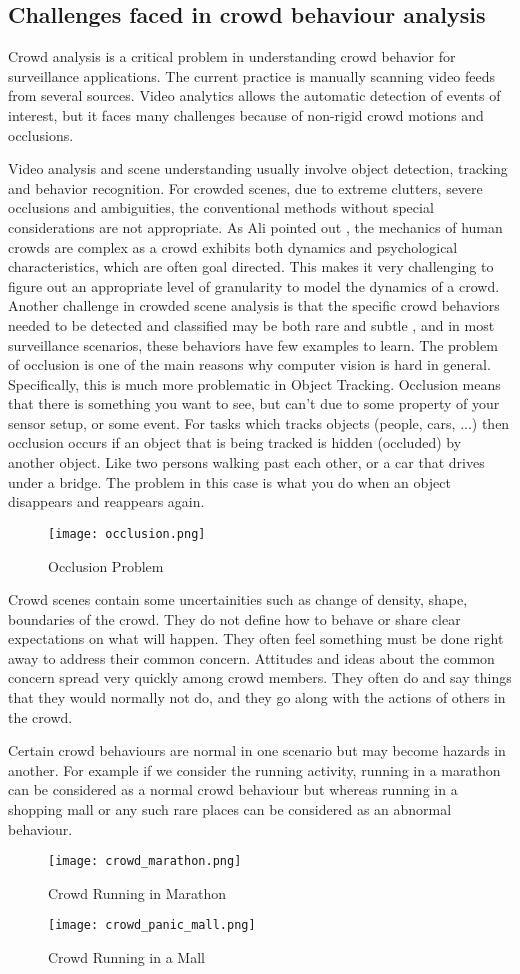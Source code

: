 \subsection{Challenges faced in crowd behaviour analysis}
Crowd analysis is a critical problem in understanding crowd behavior for
surveillance applications. The current practice is manually scanning video feeds from
several sources. Video analytics allows the automatic detection of events of interest, but
it faces many challenges because of non-rigid crowd motions and occlusions.\par
Video analysis and scene understanding usually involve object detection,
tracking and behavior recognition. For crowded scenes, due to extreme clutters, severe
occlusions and ambiguities, the conventional methods without special considerations are
not appropriate. As Ali pointed out , the mechanics of human crowds are complex as a
crowd exhibits both dynamics and psychological characteristics, which are often goal
directed. This makes it very challenging to figure out an appropriate level of granularity
to model the dynamics of a crowd. Another challenge in crowded scene analysis is that
the specific crowd behaviors needed to be detected and classified may be both rare and
subtle , and in most surveillance scenarios, these behaviors have few examples to learn.
The problem of occlusion is one of the main reasons why computer vision is
hard in general. Specifically, this is much more problematic in Object Tracking.
Occlusion means that there is something you want to see, but can't due to some property
of your sensor setup, or some event. For tasks which tracks objects (people, cars, ...)
then occlusion occurs if an object that is being tracked is hidden (occluded) by another
object. Like two persons walking past each other, or a car that drives under a bridge.
The problem in this case is what you do when an object disappears and reappears again.
\begin{figure}[H]
\centering
\texttt{[image: occlusion.png]}
\caption{Occlusion Problem}
\end{figure}
Crowd scenes contain some uncertainities such as change of density, shape,
boundaries of the crowd. They do not define how to behave or share clear expectations
on what will happen. They often feel something must be done right away to address
their common concern. Attitudes and ideas about the common concern spread very
quickly among crowd members. They often do and say things that they would normally
not do, and they go along with the actions of others in the crowd.\par
Certain crowd behaviours are normal in one scenario but may become hazards in
another. For example if we consider the running activity, running in a marathon can be
considered as a normal crowd behaviour but whereas running in a shopping mall or any
such rare places can be considered as an abnormal behaviour.
\begin{figure}[H]
\centering
\texttt{[image: crowd\_marathon.png]}
\caption{Crowd Running in Marathon}
\end{figure}
\begin{figure}[H]
\centering
\texttt{[image: crowd\_panic\_mall.png]}
\caption{Crowd Running in a Mall}
\end{figure}
